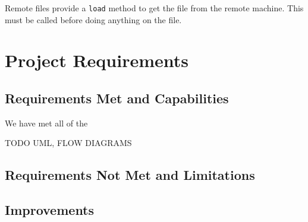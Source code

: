 \documentclass[12pt]{article}
\newcommand{\ttt}{\texttt}
\begin{document}
Remote files provide a \ttt{load} method to get the file from the remote machine. This must be called before doing anything on the file.

\section{Project Requirements}

\subsection{Requirements Met and Capabilities}

We have met all of the 

TODO UML, FLOW DIAGRAMS

\subsection{Requirements Not Met and Limitations}

\subsection{Improvements}
\end{document}
